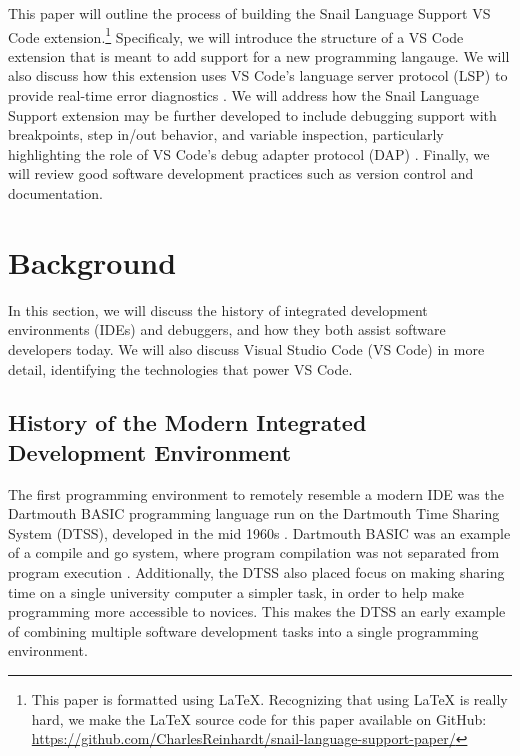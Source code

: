 \documentclass{article}
\begin{document}
This paper will outline the process of building the Snail Language Support VS Code extension.\footnote{This paper is formatted using \LaTeX. Recognizing that using \LaTeX \hspace{1pt} is really hard, we make the \LaTeX \hspace{1pt} source code for this paper available on GitHub: \url{https://github.com/CharlesReinhardt/snail-language-support-paper/}} Specificaly, we will introduce the structure of a VS Code extension that is meant to add support for a new programming langauge. We will also discuss how this extension uses VS Code's language server protocol (LSP) to provide real-time error diagnostics \cite{Microsoft_2022a}. We will address how the Snail Language Support extension may be further developed to include debugging support with breakpoints, step in/out behavior, and variable inspection, particularly highlighting the role of VS Code's debug adapter protocol (DAP) \cite{Microsoft_2021a}. Finally, we will review good software development practices such as version control and documentation. 

\section{Background}

In this section, we will discuss the history of integrated development environments (IDEs) and debuggers, and how they both assist software developers today. We will also discuss Visual Studio Code (VS Code) in more detail, identifying the technologies that power VS Code. 

\subsection{History of the Modern Integrated Development Environment}

The first programming environment to remotely resemble a modern IDE was the Dartmouth BASIC programming language run on the Dartmouth Time Sharing System (DTSS), developed in the mid 1960s \cite{KemenyKurtz_1968, Kurtz_1978}. Dartmouth BASIC was an example of a compile and go system, where program compilation was not separated from program execution \cite{Weik_2001}. Additionally, the DTSS also placed focus on making sharing time on a single university computer a simpler task, in order to help make programming more accessible to novices. This makes the DTSS an early example of combining multiple software development tasks into a single programming environment.
\end{document}
